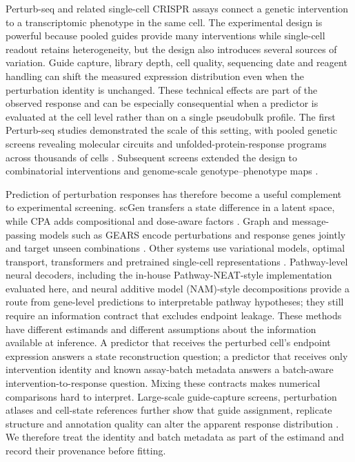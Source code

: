 \documentclass[10pt]{article}
\begin{document}
Perturb-seq and related single-cell CRISPR assays connect a genetic intervention to a transcriptomic phenotype in the same cell. The experimental design is powerful because pooled guides provide many interventions while single-cell readout retains heterogeneity, but the design also introduces several sources of variation. Guide capture, library depth, cell quality, sequencing date and reagent handling can shift the measured expression distribution even when the perturbation identity is unchanged. These technical effects are part of the observed response and can be especially consequential when a predictor is evaluated at the cell level rather than on a single pseudobulk profile. The first Perturb-seq studies demonstrated the scale of this setting, with pooled genetic screens revealing molecular circuits and unfolded-protein-response programs across thousands of cells \citep{dixit2016,adamson2016}. Subsequent screens extended the design to combinatorial interventions and genome-scale genotype--phenotype maps \citep{datlinger2017,gasperini2019,mcfalinefigueroa2019,schraivogel2020,pmid32231336,pmid35688146,replogle2022}.

Prediction of perturbation responses has therefore become a useful complement to experimental screening. scGen transfers a state difference in a latent space, while CPA adds compositional and dose-aware factors \citep{lotfollahi2019,lotfollahi2020}. Graph and message-passing models such as GEARS encode perturbations and response genes jointly and target unseen combinations \citep{roohani2023}. Other systems use variational models, optimal transport, transformers and pretrained single-cell representations \citep{lopez2018,lotfollahi2022,geneformer2023,pmid35510185,pmid37154091,pmid34139164,pmid36608654,pmid36755098,pmid38844628,pmid40759747,scbert2022,qi2024}. Pathway-level neural decoders, including the in-house Pathway-NEAT-style implementation evaluated here, and neural additive model (NAM)-style decompositions provide a route from gene-level predictions to interpretable pathway hypotheses; they still require an information contract that excludes endpoint leakage. These methods have different estimands and different assumptions about the information available at inference. A predictor that receives the perturbed cell's endpoint expression answers a state reconstruction question; a predictor that receives only intervention identity and known assay-batch metadata answers a batch-aware intervention-to-response question. Mixing these contracts makes numerical comparisons hard to interpret. Large-scale guide-capture screens, perturbation atlases and cell-state references further show that guide assignment, replicate structure and annotation quality can alter the apparent response distribution \citep{pmid31422865,pmid33243861,pmid38772369,pmid37053306}. We therefore treat the identity and batch metadata as part of the estimand and record their provenance before fitting.
\end{document}
